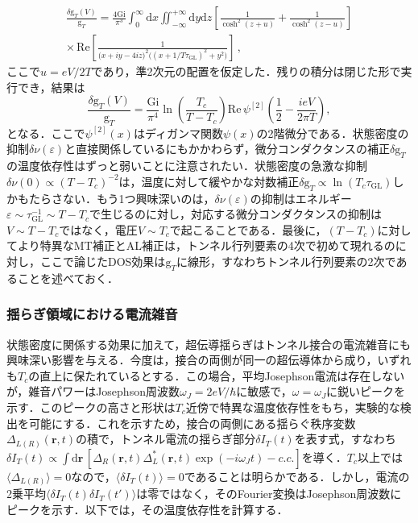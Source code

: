 \documentclass[a4paper,11pt]{ltjsarticle}
\def\d{\mathrm{d}}
\def\rt{(\mathbf{r},t)}
\begin{document}
\begin{eqnarray}
\frac{\delta\mathrm{g}_{T}(V)}{\mathrm{g}_{T}}=\frac{4\mathrm{Gi}}{\pi^{3}}
\int^{\infty}_{0}\d x\iint^{+\infty}_{-\infty}\d y\d
z\left[\frac{1}{\cosh^{2}(z+u)}+\frac{1}{\cosh^{2}(z-u)}\right]\\
\times\,\mathrm{Re}\left[\frac{1}{\big(x+iy-4iz\big)^{2}
\big((x+1/T\tau_{\mathrm{GL}})^{2}+y^{2}\big)}\right]\,,
\end{eqnarray}
ここで$u=eV/2T$であり，準2次元の配置を仮定した．残りの積分は閉じた形で実行でき，結果は\cite{VarlamovDorin}
\begin{equation}
\frac{\delta\mathrm{g}_{T}(V)}{\mathrm{g}_{T}}=\frac{\mathrm{Gi}}{\pi^{4}}
\ln\left(\frac{T_{c}}{T-T_{c}}\right)
\mathrm{Re}\,\psi^{[2]}\left(\frac{1}{2}-\frac{ieV}{2\pi T}\right),
\end{equation}
となる．ここで$\psi^{[2]}(x)$はディガンマ関数$\psi(x)$の2階微分である．状態密度の抑制$\delta\nu(\varepsilon)$と直接関係しているにもかかわらず，微分コンダクタンスの補正$\delta\mathrm{g}_{T}$の温度依存性はずっと弱いことに注意されたい．状態密度の急激な抑制$\delta\nu(0)\propto(T-T_{c})^{-2}$は，温度に対して緩やかな対数補正$\delta\mathrm{g}_{T}\propto\ln(T_{c}\tau_{\mathrm{GL}})$しかもたらさない．もう1つ興味深いのは，$\delta\nu(\varepsilon)$の抑制はエネルギー$\varepsilon\sim\tau^{-1}_{\mathrm{GL}}\sim T-T_{c}$で生じるのに対し，対応する微分コンダクタンスの抑制は$V\sim T-T_c$ではなく，電圧$V\sim T_{c}$で起こることである．最後に，$(T-T_c)$に対してより特異なMT補正とAL補正は，トンネル行列要素の4次で初めて現れるのに対し，ここで論じたDOS効果は$\mathrm{g}_{T}$に線形，すなわちトンネル行列要素の2次であることを述べておく．


\subsubsection{揺らぎ領域における電流雑音}\label{app_Part-IV-6}

状態密度に関係する効果に加えて，超伝導揺らぎはトンネル接合の電流雑音にも興味深い影響を与える\cite{Larkin-Varlamov,Kulik,Scalapino,Martin-Balatsky,Levchenko-J-Noise}．今度は，接合の両側が同一の超伝導体から成り，いずれも$T_c$の直上に保たれているとする．この場合，平均Josephson電流は存在しないが，雑音パワーはJosephson周波数$\omega_J=2eV/\hbar$に敏感で，$\omega=\omega_{J}$に鋭いピークを示す．このピークの高さと形状は$T_c$近傍で特異な温度依存性をもち，実験的な検出を可能にする．これを示すため，接合の両側にある揺らぐ秩序変数$\Delta_{L(R)}\rt$の積で，トンネル電流の揺らぎ部分$\delta I_{T}(t)$を表す式，すなわち$\delta I_{T}(t)\propto\int\d\mathbf{r}\,[\Delta_{R}\rt\Delta^{*}_{L}\rt\exp(-i\omega_{J}t)-c.c.]$を導く．$T_{c}$以上では$\langle\Delta_{L(R)}\rangle=0$なので，$\langle\delta I_{T}(t)\rangle=0$であることは明らかである．しかし，電流の2乗平均$\langle\delta I_{T}(t)\delta I_{T}(t')\rangle$は零ではなく，そのFourier変換はJosephson周波数にピークを示す．以下では，その温度依存性を計算する．
\end{document}
